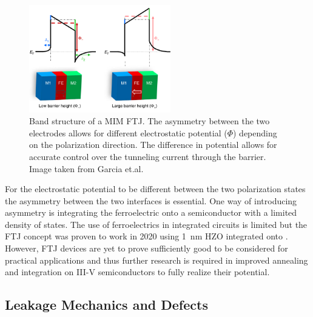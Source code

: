 \documentclass[11pt,twoside]{eitExjobb}
\begin{document}
\begin{figure}[htbp]
    \centering
    \includegraphics[width=0.55\textwidth]{fig/img/FTJbandstructure.png}
    \caption{Band structure of a MIM FTJ. The asymmetry between the two
        electrodes allows for different electrostatic potential ($\Phi$)
        depending on the polarization direction. The difference in potential
        allows for accurate control over the tunneling current through the
        barrier. Image taken from Garcia et.al. \cite{garcia2014ferroelectric}}
    \label{fig:theo_FTJband}
\end{figure}

For the electrostatic potential to be different between the two polarization
states the asymmetry between the two interfaces is essential. One way of
introducing asymmetry is integrating the ferroelectric onto a semiconductor
with a limited density of states. The use of ferroelectrics in integrated
circuits is limited but the FTJ concept was proven to work in 2020 using
\SI{1}{\nano\meter} HZO integrated onto  \cite{cheema2020one,
mikolajick2020past}. However, FTJ devices are yet to prove sufficiently good to
be considered for practical applications and thus further research is required
in improved annealing and integration on III-V semiconductors to fully realize
their potential.

\subsection{Leakage Mechanics and Defects}

\end{document}
